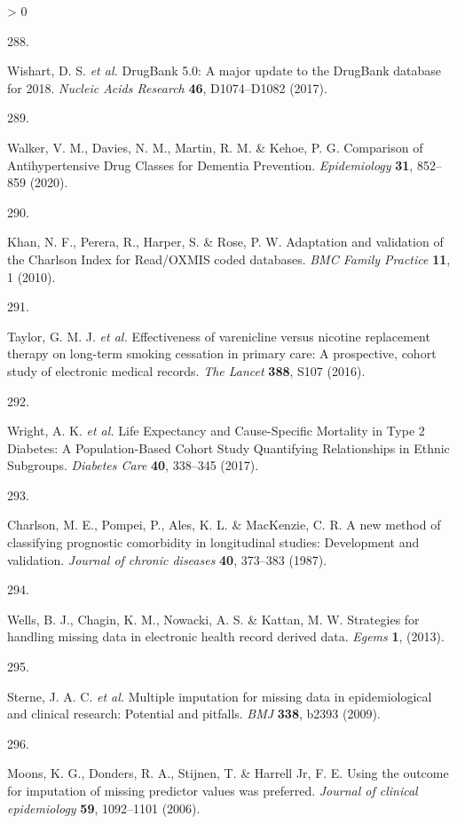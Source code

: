 \documentclass[a4paper, twoside]{templates/ociamthesis}
\newlength{\cslhangindent}
\newlength{\csllabelwidth}
\newenvironment{CSLReferences}[3] %
 {%
  \setlength{\parindent}{0pt}
  \ifodd #1 \everypar{\setlength{\hangindent}{\cslhangindent}}\ignorespaces\fi
  \ifnum #2 > 0
  \setlength{\parskip}{#2\baselineskip}
  \fi
 }%
 {}
\newcommand{\CSLLeftMargin}[1]{\parbox[t]{\maxof{\widthof{#1}}{\csllabelwidth}}{#1}}
\newcommand{\CSLRightInline}[1]{\parbox[t]{\linewidth - \csllabelwidth}{#1}}
\begin{document}
\begin{CSLReferences}{0}{0}
\leavevmode\hypertarget{ref-wishart2017}{}%
\CSLLeftMargin{288. }
\CSLRightInline{Wishart, D. S. \emph{et al.} {DrugBank} 5.0: A major update to the {DrugBank} database for 2018. \emph{Nucleic Acids Research} \textbf{46}, D1074--D1082 (2017).}

\leavevmode\hypertarget{ref-walker2020}{}%
\CSLLeftMargin{289. }
\CSLRightInline{Walker, V. M., Davies, N. M., Martin, R. M. \& Kehoe, P. G. Comparison of {Antihypertensive Drug Classes} for {Dementia Prevention}. \emph{Epidemiology} \textbf{31}, 852--859 (2020).}

\leavevmode\hypertarget{ref-khan2010}{}%
\CSLLeftMargin{290. }
\CSLRightInline{Khan, N. F., Perera, R., Harper, S. \& Rose, P. W. Adaptation and validation of the {Charlson Index} for {Read}/{OXMIS} coded databases. \emph{BMC Family Practice} \textbf{11}, 1 (2010).}

\leavevmode\hypertarget{ref-taylor2016}{}%
\CSLLeftMargin{291. }
\CSLRightInline{Taylor, G. M. J. \emph{et al.} Effectiveness of varenicline versus nicotine replacement therapy on long-term smoking cessation in primary care: A prospective, cohort study of electronic medical records. \emph{The Lancet} \textbf{388}, S107 (2016).}

\leavevmode\hypertarget{ref-wright2017}{}%
\CSLLeftMargin{292. }
\CSLRightInline{Wright, A. K. \emph{et al.} Life {Expectancy} and {Cause}-{Specific Mortality} in {Type} 2 {Diabetes}: A {Population}-{Based Cohort Study Quantifying Relationships} in {Ethnic Subgroups}. \emph{Diabetes Care} \textbf{40}, 338--345 (2017).}

\leavevmode\hypertarget{ref-charlson1987new}{}%
\CSLLeftMargin{293. }
\CSLRightInline{Charlson, M. E., Pompei, P., Ales, K. L. \& MacKenzie, C. R. A new method of classifying prognostic comorbidity in longitudinal studies: Development and validation. \emph{Journal of chronic diseases} \textbf{40}, 373--383 (1987).}

\leavevmode\hypertarget{ref-wells2013strategies}{}%
\CSLLeftMargin{294. }
\CSLRightInline{Wells, B. J., Chagin, K. M., Nowacki, A. S. \& Kattan, M. W. Strategies for handling missing data in electronic health record derived data. \emph{Egems} \textbf{1}, (2013).}

\leavevmode\hypertarget{ref-sterne2009}{}%
\CSLLeftMargin{295. }
\CSLRightInline{Sterne, J. A. C. \emph{et al.} Multiple imputation for missing data in epidemiological and clinical research: Potential and pitfalls. \emph{BMJ} \textbf{338}, b2393 (2009).}

\leavevmode\hypertarget{ref-moons2006}{}%
\CSLLeftMargin{296. }
\CSLRightInline{Moons, K. G., Donders, R. A., Stijnen, T. \& Harrell Jr, F. E. Using the outcome for imputation of missing predictor values was preferred. \emph{Journal of clinical epidemiology} \textbf{59}, 1092--1101 (2006).}


\end{CSLReferences}
\end{document}
